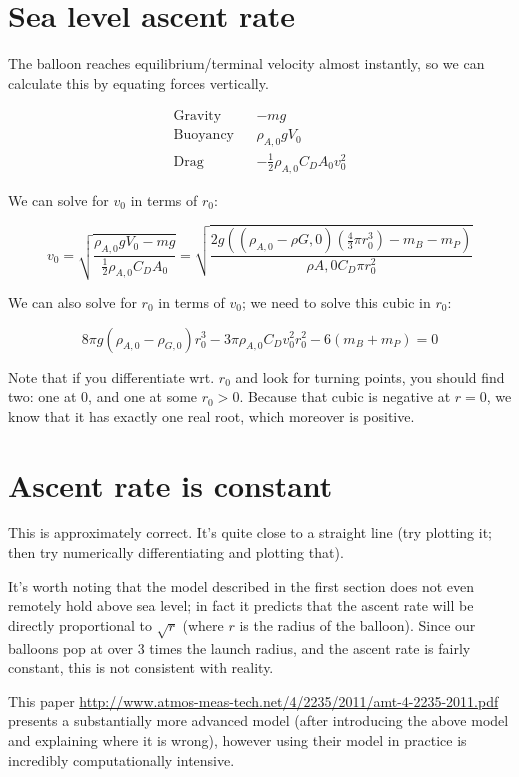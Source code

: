 \documentclass{article}
\begin{document}
\section{Sea level ascent rate}

The balloon reaches equilibrium/terminal velocity almost instantly,
so we can calculate this by equating forces vertically.

\begin{align*}
    \text{Gravity} && -mg \\
    \text{Buoyancy} && \rho_{A,0} g V_0 \\
    \text{Drag} && -\frac{1}{2} \rho_{A,0} C_D A_0 v_0^2
\end{align*}

We can solve for $v_0$ in terms of $r_0$:

\[
    v_0
    = \sqrt{
        \frac{ \rho_{A,0}gV_0 - mg }%
             { \frac{1}{2} \rho_{A,0} C_D A_0 }
        }
%
    = \sqrt{
        \frac{ 2g ((\rho_{A,0} - \rho{G,0}) (\frac{4}{3} \pi r_0^3) - m_B - m_P) }%
             { \rho{A,0} C_D \pi r_0^2 }
        }
\]

We can also solve for $r_0$ in terms of $v_0$; we need to solve this cubic in $r_0$:

\[
       8 \pi g (\rho_{A,0} - \rho_{G,0}) r_0^3
     - 3 \pi \rho_{A,0} C_D v_0^2 r_0 ^2
     - 6 (m_B + m_P)
      = 0
\]

Note that if you differentiate wrt. $r_0$ and look for turning points, you should find two:
one at $0$, and one at some $r_0 > 0$. Because that cubic is negative at $r = 0$, we know
that it has exactly one real root, which moreover is positive.

\section{Ascent rate is constant}

This is approximately correct. It's quite close to a straight line
(try plotting it; then try numerically differentiating and plotting that).

It's worth noting that the model described in the first section does not even remotely hold
above sea level; in fact it predicts that the ascent rate will be directly proportional
to $\sqrt{r}$ (where $r$ is the radius of the balloon). Since our balloons pop at over
$3$ times the launch radius, and the ascent rate is fairly constant,
this is not consistent with reality.

This paper \url{http://www.atmos-meas-tech.net/4/2235/2011/amt-4-2235-2011.pdf} presents
a substantially more advanced model (after introducing the above model and explaining
where it is wrong), however using their model in practice is incredibly computationally
intensive.
\end{document}
